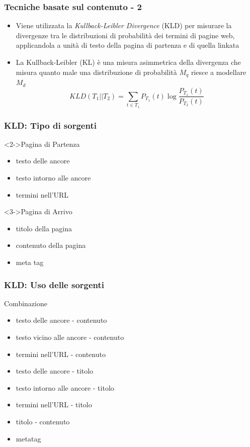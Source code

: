 \documentclass{beamer}
\begin{document}
\begin{frame}
    \frametitle{Tecniche basate sul contenuto - 2}
    \begin{itemize}
     \item Viene utilizzata la \textit{Kullback-Leibler Divergence} (KLD) per misurare la divergenze tra le distribuzioni di probabilità dei termini	di pagine web, applicandola a unità di testo della pagina di partenza e di quella linkata
     \item La Kullback-Leibler (KL) è una misura  asimmetrica della divergenza che misura quanto male una distribuzione di probabilità \(M_q\) riesce a modellare \(M_d\)
     \begin{equation}
KLD(T_1||T_2) = \sum_{t \in T_1} P_{T_1}(t) \log \frac{P_{T_1}(t)}{P_{T_2}(t)}
\label{eqn:kld}
     \end{equation}
\end{itemize}
\end{frame}
\begin{frame}
  \frametitle{KLD: Tipo di sorgenti}
  \begin{block}<2->{Pagina di Partenza}
  \begin{itemize}
      \item testo delle ancore  
   \item testo intorno alle ancore
   \item termini nell'URL
  \end{itemize}
  \end{block}
  \begin{block}<3->{Pagina di Arrivo}
  \begin{itemize}
   \item titolo della pagina  
   \item contenuto della pagina
   \item meta tag
  \end{itemize}
  \end{block}
\end{frame}
\begin{frame}
  \frametitle{KLD: Uso delle sorgenti}
  \begin{block}{Combinazione}
  \begin{itemize}
      \item testo delle ancore - contenuto  
      \item testo vicino alle ancore - contenuto
      \item termini nell’URL - contenuto
      \item testo delle ancore - titolo
      \item testo intorno alle ancore - titolo
      \item termini nell’URL - titolo
      \item titolo - contenuto
      \item metatag
  \end{itemize}
  \end{block}
\end{frame}
\end{document}
